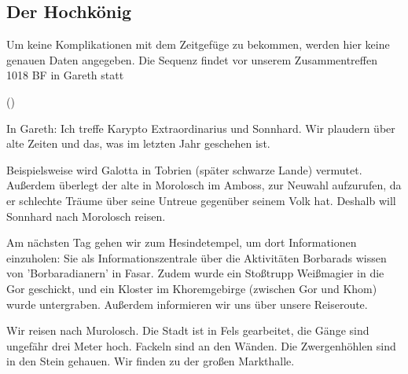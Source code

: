 
\subsection{Der Hochkönig}
\label{sec:der-hochkonig}
Um keine Komplikationen mit dem Zeitgefüge zu bekommen, werden hier keine genauen Daten angegeben. Die Sequenz findet vor unserem Zusammentreffen 1018 BF in Gareth statt 

()


In Gareth: Ich treffe Karypto Extraordinarius und Sonnhard. Wir plaudern über alte Zeiten und das, was im letzten Jahr geschehen ist.

Beispielsweise wird Galotta in Tobrien (später schwarze Lande) vermutet. Außerdem überlegt der alte  in Morolosch im Amboss, zur Neuwahl aufzurufen, da er schlechte Träume über seine Untreue gegenüber seinem Volk hat. Deshalb will Sonnhard nach Morolosch reisen. 

Am nächsten Tag gehen wir zum Hesindetempel, um dort Informationen einzuholen: Sie als Informationszentrale über die Aktivitäten Borbarads wissen von 'Borbaradianern' in Fasar. Zudem wurde ein Stoßtrupp Weißmagier in die Gor geschickt, und ein Kloster im Khoremgebirge (zwischen Gor und Khom) wurde untergraben. Außerdem informieren wir uns über unsere Reiseroute. 

Wir reisen nach Murolosch. Die Stadt ist in Fels gearbeitet, die Gänge sind ungefähr drei Meter hoch. Fackeln sind an den Wänden. Die Zwergenhöhlen sind in den Stein gehauen. Wir finden zu der großen Markthalle. 

